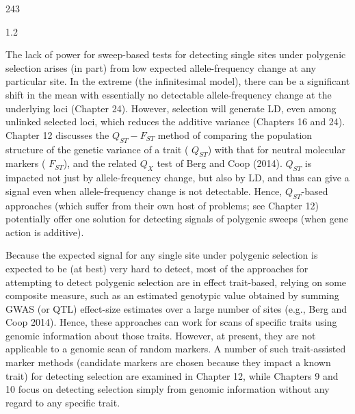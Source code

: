 \documentclass{article}
\begin{document}
243

1.2%

The lack of power for sweep-based tests for detecting single sites under polygenic selection arises (in part) from low expected allele-frequency change at any particular site. In the extreme (the infinitesimal model), there can be a significant shift in the mean with essentially no detectable allele-frequency change at the underlying loci (Chapter 24). However, selection will generate LD, even among unlinked selected loci, which reduces the additive variance (Chapters 16 and 24). Chapter 12 discusses the  $ Q_{ST} - F_{ST} $ method of comparing the population structure of the genetic variance of a trait ( $ Q_{ST} $) with that for neutral molecular markers ( $ F_{ST} $), and the related  $ Q_{X} $ test of Berg and Coop (2014).  $ Q_{ST} $ is impacted not just by allele-frequency change, but also by LD, and thus can give a signal even when allele-frequency change is not detectable. Hence,  $ Q_{ST} $-based approaches (which suffer from their own host of problems; see Chapter 12) potentially offer one solution for detecting signals of polygenic sweeps (when gene action is additive).

Because the expected signal for any single site under polygenic selection is expected to be (at best) very hard to detect, most of the approaches for attempting to detect polygenic selection are in effect trait-based, relying on some composite measure, such as an estimated genotypic value obtained by summing GWAS (or QTL) effect-size estimates over a large number of sites (e.g., Berg and Coop 2014). Hence, these approaches can work for scans of specific traits using genomic information about those traits. However, at present, they are not applicable to a genomic scan of random markers. A number of such trait-assisted marker methods (candidate markers are chosen because they impact a known trait) for detecting selection are examined in Chapter 12, while Chapters 9 and 10 focus on detecting selection simply from genomic information without any regard to any specific trait.
\end{document}

